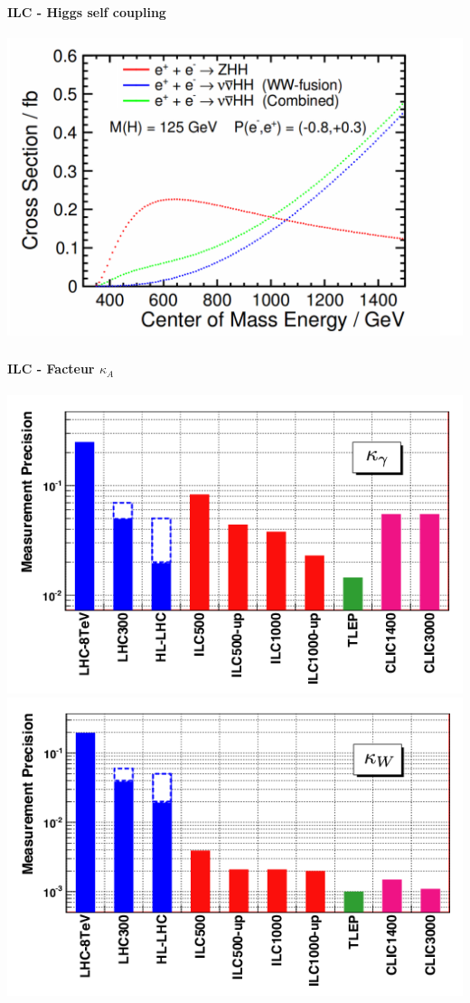 \documentclass[8pt]{beamer}
\begin{document}
  \begin{frame}
  \frametitle{\backup}
  \framesubtitle{ILC - Higgs self coupling}
    \begin{center}
      \includegraphics[width=\linewidth]{HiggsSelfCouplingCrossSections.png}
    \end{center}
  \end{frame}


  \begin{frame}
  \frametitle{\backup}
  \framesubtitle{ILC - Facteur $\kappa_A$}
    \begin{center}
      \includegraphics[width=0.48\linewidth]{Energy_kappa_gam.png}
      \includegraphics[width=0.48\linewidth]{Energy_kappa_W.png}
    \end{center}
  \end{frame}
\end{document}
